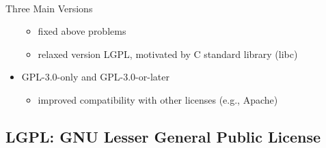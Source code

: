 \begin{frame}{\insertsubsection\ }
\begin{fancycolumns}
\begin{note}{Three Main Versions}
\begin{itemize}
\begin{itemize}
					\item fixed above problems
					\item relaxed version LGPL, motivated by C standard library (libc)
				\end{itemize}
				\item GPL-3.0-only and GPL-3.0-or-later
				\begin{itemize}
					\item improved compatibility with other licenses (e.g., Apache)
				\end{itemize}
			\end{itemize}
		\end{note}
	\end{fancycolumns}
\end{frame}

\subsection{LGPL: GNU Lesser General Public License}
